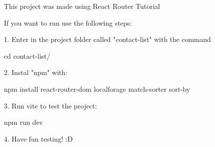 This project was made using React Router Tutorial

If you want to run use the following steps:

1. Enter in the project folder called "contact-list" with the command

    cd contact-list/

2. Instal "npm" with:

    npm install react-router-dom localforage match-sorter sort-by

3. Run vite to test the project:

    npm run dev

4. Have fun testing! :D